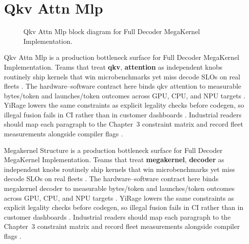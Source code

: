 \section{Qkv Attn Mlp}
\label{sec:qkv_attn_mlp}
\begin{figure}[t]
\centering
{}
\caption{Qkv Attn Mlp block diagram for Full Decoder MegaKernel Implementation.}
\label{fig:qkv_attn_mlp_architecture}
\end{figure}


Qkv Attn Mlp is a production bottleneck surface for Full Decoder MegaKernel Implementation. Teams that treat \textbf{qkv}, \textbf{attention} as independent knobs routinely ship kernels that win microbenchmarks yet miss decode SLOs on real fleets \citep{taxbreak2026,semianalysis2024tma}. The hardware--software contract here binds qkv attention to measurable bytes/token and launches/token outcomes across GPU, CPU, and NPU targets \citep{memoryfloor2026,amd2024xdna}. YiRage lowers the same constraints as explicit legality checks before codegen, so illegal fusion fails in CI rather than in customer dashboards \citep{nvidia2022hopper,amd2024aie}. Industrial readers should map each paragraph to the Chapter~3 constraint matrix and record fleet measurements alongside compiler flags \citep{semianalysis2024tma,dlbook}.

Megakernel Structure is a production bottleneck surface for Full Decoder MegaKernel Implementation. Teams that treat \textbf{megakernel}, \textbf{decoder} as independent knobs routinely ship kernels that win microbenchmarks yet miss decode SLOs on real fleets \citep{liu2024deepseekv3,memoryfloor2026}. The hardware--software contract here binds megakernel decoder to measurable bytes/token and launches/token outcomes across GPU, CPU, and NPU targets \citep{patel2025llminference,nvidia2022hopper}. YiRage lowers the same constraints as explicit legality checks before codegen, so illegal fusion fails in CI rather than in customer dashboards \citep{taxbreak2026,semianalysis2024tma}. Industrial readers should map each paragraph to the Chapter~3 constraint matrix and record fleet measurements alongside compiler flags \citep{memoryfloor2026,amd2024xdna}.

